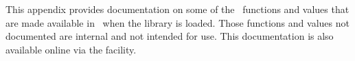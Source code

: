 This appendix provides documentation on some of the \ML\ functions and values
that are made available in \HOL\ when the  library is loaded. Those
functions and values not documented are internal and not intended for use.
This documentation is also available online via the  facility.


